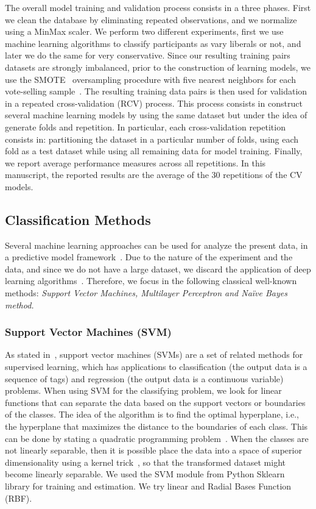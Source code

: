 \documentclass[onesided]{article}\usepackage[]{graphicx}\usepackage[]{color}
\begin{document}
The overall model training and validation process consists in a three phases. First we clean the database by eliminating repeated observations, and we normalize using a MinMax scaler. We perform two different experiments, first we use machine learning algorithms to classify participants as vary liberals or not, and later we do the same for very conservative. Since our resulting training pairs datasets are strongly imbalanced, prior to the construction of learning models, we use the SMOTE~\cite{chawla2002smote} oversampling procedure with five nearest neighbors for each vote-selling sample~\cite{artetxe2020balanced}. The resulting training data pairs is then used for validation in a repeated cross-validation (RCV) process. This process consists in construct several machine learning models by using the same dataset but under the idea of generate folds and repetition. In particular, each cross-validation repetition consists in: partitioning the dataset in a particular number of folds, using each fold as a test dataset while using all remaining data for model training. Finally, we report average performance measures across all repetitions. In this manuscript, the reported results are the average of the 30 repetitions of the CV models.

\subsection{Classification Methods}

Several machine learning approaches can be used for analyze the present data, in a predictive model framework~\cite{vapnik2013nature,witten2002data,maimon2005data}. Due to the nature of the experiment and the data, and since we do not have a large dataset, we discard the application of deep learning algorithms~\cite{balas2019handbook}. Therefore, we focus in the following classical well-known methods: \textit{Support Vector Machines, Multilayer Perceptron and Na\"ive Bayes method.}

\subsubsection{Support Vector Machines (SVM)} As stated in~\cite[Chapter 12]{maimon2005data}, support vector machines (SVMs) are a set of related methods for supervised learning, which has applications to classification (the output data is a sequence of tags) and regression (the output data is a continuous variable) problems. When using SVM for the classifying problem, we look for linear functions that can separate the data based on the support vectors or boundaries of the classes. The idea of the algorithm is to find the optimal hyperplane, i.e., the hyperplane that maximizes the distance to the boundaries of each class. This can be done by stating a quadratic programming problem~\cite{vapnik2013nature}. When the classes are not linearly separable, then it is possible place the data into a space of superior dimensionality using a kernel trick~\cite{vapnik2013nature,maimon2005data}, so that the transformed dataset might become linearly separable. We used the SVM module from Python Sklearn library for training and estimation. We try linear and Radial Bases Function (RBF).
\end{document}
